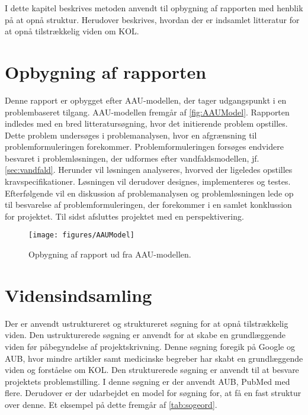 I dette kapitel beskrives metoden anvendt til opbygning af rapporten med henblik på at opnå struktur. Herudover beskrives, hvordan der er indsamlet litteratur for at opnå tilstrækkelig viden om KOL.


\section{Opbygning af rapporten}
Denne rapport er opbygget efter AAU-modellen, der tager udgangspunkt i en problembaseret tilgang. AAU-modellen fremgår af \autoref{fig:AAUModel}. Rapporten indledes med en bred litteratursøgning, hvor det initierende problem opstilles. Dette problem undersøges i problemanalysen, hvor en afgrænsning til problemformuleringen forekommer. Problemformuleringen forsøges endvidere besvaret i problemløsningen, der udformes efter vandfaldsmodellen, jf. \autoref{sec:vandfald}. Herunder vil løsningen analyseres, hvorved der ligeledes opstilles kravspecifikationer. Løsningen vil derudover designes, implementeres og testes. Efterfølgende vil en diskussion af problemanalysen og problemløsningen lede op til besvarelse af problemformuleringen, der forekommer i en samlet konklussion for projektet. Til sidst afsluttes projektet med en perspektivering.


\begin{figure} [H]
\centering
\texttt{[image: figures/AAUModel]}
\caption{Opbygning af rapport ud fra AAU-modellen.}
\label{fig:AAUModel}
\end{figure} 

\section{Vidensindsamling}
Der er anvendt ustruktureret og struktureret søgning for at opnå tilstrækkelig viden. Den ustrukturerede søgning er anvendt for at skabe en grundlæggende viden før påbegyndelse af projektskrivning. Denne søgning foregik på Google og AUB, hvor mindre artikler samt medicinske begreber har skabt en grundlæggende viden og forståelse om KOL. Den strukturerede søgning er anvendt til at besvare projektets problemstilling. I denne søgning er der anvendt AUB, PubMed med flere. Derudover er der udarbejdet en model for søgning for, at få en fast struktur over denne. Et eksempel på dette fremgår af \autoref{tab:sogeord}.

